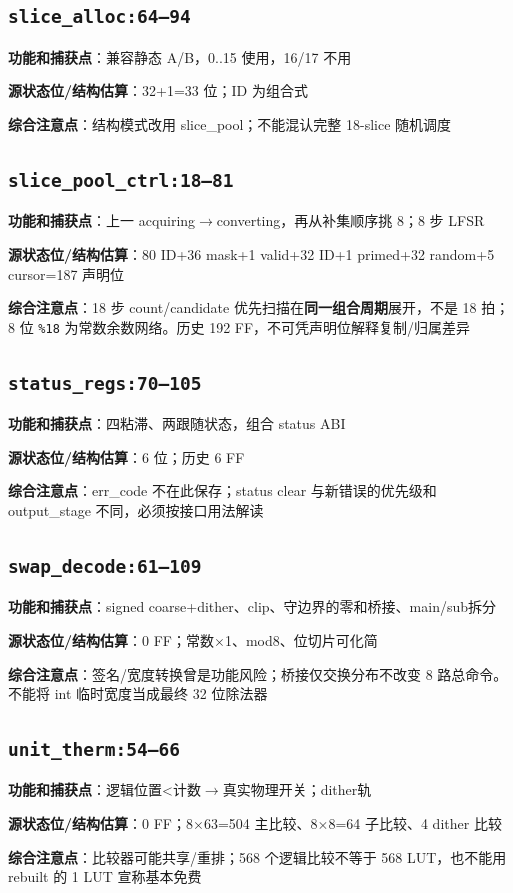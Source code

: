 \documentclass[UTF8,fontset=fandol,10pt,a4paper,openany]{ctexrep}
\newcommand{\code}[1]{\nolinkurl{#1}}
\begin{document}
\subsection*{\code{slice_alloc:64–94}}
\noindent\textbf{功能和捕获点}：兼容静态 A/B，0..15 使用，16/17 不用\par
\noindent\textbf{源状态位/结构估算}：32+1=33 位；ID 为组合式\par
\noindent\textbf{综合注意点}：结构模式改用 slice\_pool；不能混认完整 18-slice 随机调度\par
\subsection*{\code{slice_pool_ctrl:18–81}}
\noindent\textbf{功能和捕获点}：上一 acquiring\ensuremath{\rightarrow}converting，再从补集顺序挑 8；8 步 LFSR\par
\noindent\textbf{源状态位/结构估算}：80 ID+36 mask+1 valid+32 ID+1 primed+32 random+5 cursor=187 声明位\par
\noindent\textbf{综合注意点}：18 步 count/candidate 优先扫描在\textbf{同一组合周期}展开，不是 18 拍；8 位 \code{\%18} 为常数余数网络。历史 192 FF，不可凭声明位解释复制/归属差异\par
\subsection*{\code{status_regs:70–105}}
\noindent\textbf{功能和捕获点}：四粘滞、两跟随状态，组合 status ABI\par
\noindent\textbf{源状态位/结构估算}：6 位；历史 6 FF\par
\noindent\textbf{综合注意点}：err\_code 不在此保存；status clear 与新错误的优先级和 output\_stage 不同，必须按接口用法解读\par
\subsection*{\code{swap_decode:61–109}}
\noindent\textbf{功能和捕获点}：signed coarse+dither、clip、守边界的零和桥接、main/sub拆分\par
\noindent\textbf{源状态位/结构估算}：0 FF；常数\ensuremath{\times}1、mod8、位切片可化简\par
\noindent\textbf{综合注意点}：签名/宽度转换曾是功能风险；桥接仅交换分布不改变 8 路总命令。不能将 int 临时宽度当成最终 32 位除法器\par
\subsection*{\code{unit_therm:54–66}}
\noindent\textbf{功能和捕获点}：逻辑位置<计数\ensuremath{\rightarrow}真实物理开关；dither轨\par
\noindent\textbf{源状态位/结构估算}：0 FF；8\ensuremath{\times}63=504 主比较、8\ensuremath{\times}8=64 子比较、4 dither 比较\par
\noindent\textbf{综合注意点}：比较器可能共享/重排；568 个逻辑比较不等于 568 LUT，也不能用 rebuilt 的 1 LUT 宣称基本免费\par
\end{document}
